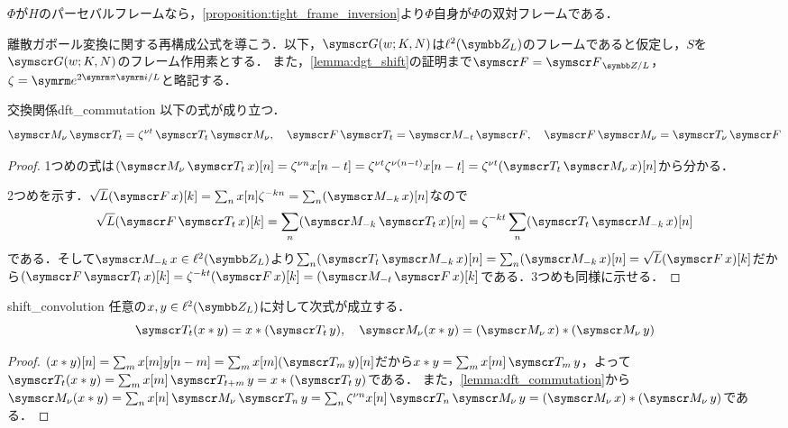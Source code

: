 \documentclass[../../main]{subfiles}
\begin{document}
\begin{example}
  \(\Phi\)が\(H\)のパーセバルフレームなら，\cref{proposition:tight_frame_inversion}より\(\Phi\)自身が\(\Phi\)の双対フレームである．
\end{example}

離散ガボール変換に関する再構成公式を導こう．以下，\(\gaborsys{w}{K}{N}\)は\(\cycles{L}\)のフレームであると仮定し，\(S\)を\(\gaborsys{w}{K}{N}\)のフレーム作用素とする．
また，\cref{lemma:dgt_shift}の証明まで\(\ftrans=\dft{L}\)，\(\zeta=\napr^{2\krez\iuni/L}\)と略記する．

\begin{lemma}{交換関係}{dft_commutation}
  以下の式が成り立つ．
  \[
    \modulate{\nu}\translate{t} = \zeta^{\nu t}\translate{t}\modulate{\nu},
    \quad\ftrans\translate{t} = \modulate{-t}\ftrans,
    \quad\ftrans\modulate{\nu} = \translate{\nu}\ftrans
  \]
\end{lemma}

\begin{proof}
  1つめの式は\((\modulate{\nu}\translate{t}x)[n]=\zeta^{\nu n}x[n-t]=\zeta^{\nu t}\zeta^{\nu(n-t)}x[n-t]=\zeta^{\nu t}(\translate{t}\modulate{\nu}x)[n]\)から分かる．

  2つめを示す．\(\sqrt{L}(\ftrans x)[k]=\sum_nx[n]\zeta^{-kn}=\sum_n(\modulate{-k}x)[n]\)なので
  \[
    \sqrt{L}(\ftrans\translate{t}x)[k] = \sum_n(\modulate{-k}\translate{t}x)[n]
    = \zeta^{-kt}\sum_n(\translate{t}\modulate{-k}x)[n]
  \]
  である．そして\(\modulate{-k}x\in\cycles{L}\)より\(\sum_n(\translate{t}\modulate{-k}x)[n]=\sum_n(\modulate{-k}x)[n]=\sqrt{L}(\ftrans x)[k]\)だから\((\ftrans\translate{t}x)[k]=\zeta^{-kt}(\ftrans x)[k]=(\modulate{-t}\ftrans x)[k]\)である．3つめも同様に示せる．
\end{proof}

\begin{lemma}{}{shift_convolution}
  任意の\(x,y\in\cycles{L}\)に対して次式が成立する．
  \[
    \translate{t}(x\circconv y) = x\circconv(\translate{t}y),
    \quad\modulate{\nu}(x\circconv y) = (\modulate{\nu}x)\circconv(\modulate{\nu}y)
  \]
\end{lemma}

\begin{proof}
  \((x\circconv y)[n]=\sum_mx[m]y[n-m]=\sum_mx[m](\translate{m}y)[n]\)だから\(x\circconv y=\sum_mx[m]\translate{m}y\)，よって\(\translate{t}(x\circconv y)=\sum_mx[m]\translate{t+m}y=x\circconv(\translate{t}y)\)である．
  また，\cref{lemma:dft_commutation}から\(\modulate{\nu}(x\circconv y)=\sum_nx[n]\modulate{\nu}\translate{n}y=\sum_n\zeta^{\nu n}x[n]\translate{n}\modulate{\nu}y=(\modulate{\nu}x)\circconv(\modulate{\nu}y)\)である．
\end{proof}
\end{document}
